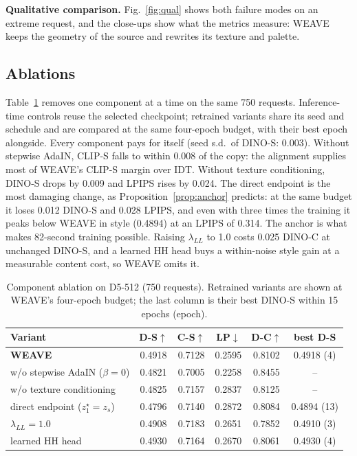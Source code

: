\documentclass[conference]{IEEEtran}
\newcommand{\dinos}{DINO-S}
\newcommand{\dinoc}{DINO-C}
\newcommand{\clips}{CLIP-S}
\begin{document}
\noindent\textbf{Qualitative comparison.} Fig.~\ref{fig:qual} shows both failure modes on an extreme request,
and the close-ups show what the metrics measure: WEAVE keeps the geometry of the source and rewrites its
texture and palette.

\subsection{Ablations}
Table~\ref{tab:ablation} removes one component at a time on the same 750 requests. Inference-time
controls reuse the selected checkpoint; retrained variants share its seed and schedule and are compared
at the same four-epoch budget, with their best epoch alongside. Every component pays for itself (seed
s.d.\ of \dinos{}: 0.003). Without stepwise AdaIN, \clips{} falls to within 0.008 of the copy: the
alignment supplies most of WEAVE's \clips{} margin over IDT. Without texture conditioning, \dinos{} drops
by 0.009 and LPIPS rises by 0.024. The direct endpoint is the most damaging change, as
Proposition~\ref{prop:anchor} predicts: at the same budget it loses 0.012 \dinos{} and 0.028 LPIPS, and
even with three times the training it peaks below WEAVE in style (0.4894) at an LPIPS of 0.314. The anchor
is what makes 82-second training possible. Raising $\lambda_{LL}$ to 1.0 costs 0.025 \dinoc{} at unchanged
\dinos{}, and a learned HH head buys a within-noise style gain at a measurable content cost, so WEAVE
omits it.

\begin{table}[t]
\centering
\caption{Component ablation on D5-512 (750 requests). Retrained variants are shown at WEAVE's
four-epoch budget; the last column is their best \dinos{} within 15 epochs (epoch).}
\label{tab:ablation}
\footnotesize
\setlength{\tabcolsep}{2.6pt}
\begin{tabular}{@{}lccccc@{}}
\toprule
Variant & D-S$\uparrow$ & C-S$\uparrow$ & LP$\downarrow$ & D-C$\uparrow$ & best D-S \\
\midrule
\textbf{WEAVE} & 0.4918 & 0.7128 & 0.2595 & 0.8102 & 0.4918 (4) \\
w/o stepwise AdaIN ($\beta{=}0$) & 0.4821 & 0.7005 & 0.2258 & 0.8455 & -- \\
w/o texture conditioning & 0.4825 & 0.7157 & 0.2837 & 0.8125 & -- \\
direct endpoint ($z_1^\star{=}z_s$) & 0.4796 & 0.7140 & 0.2872 & 0.8084 & 0.4894 (13) \\
$\lambda_{LL}{=}1.0$ & 0.4908 & 0.7183 & 0.2651 & 0.7852 & 0.4910 (3) \\
learned HH head & 0.4930 & 0.7164 & 0.2670 & 0.8061 & 0.4930 (4) \\
\bottomrule
\end{tabular}
\end{table}
\end{document}
